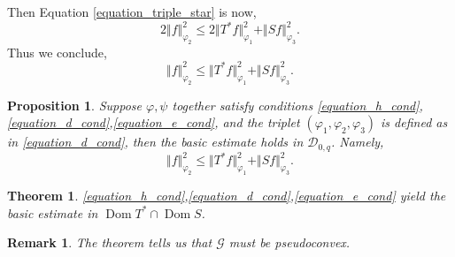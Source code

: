 \documentclass{article}
\newtheorem{theorem}{Theorem} [section]
\newtheorem{proposition}{Proposition}[section]
\newtheorem{remark}{Remark}[section]
\DeclareMathOperator{\Dom}{Dom}
\newcommand{\norm}[1]{\Vert #1 \Vert}
\newcommand{\G}[0]{\mathcal{G}}
\begin{document}
Then Equation \eqref{equation_triple_star} is now,
\begin{equation*}
  2\norm{f}_{\varphi_2}^2\leq 2\norm{T^*f}_{\varphi_1}^2+\norm{Sf}_{\varphi_3}^2.
\end{equation*}
Thus we conclude,
\begin{equation*}
  \norm{f}_{\varphi_2}^2\leq \norm{T^*f}_{\varphi_1}^2+\norm{Sf}_{\varphi_3}^2.
\end{equation*}
\begin{proposition}
  Suppose $\varphi,\psi$ together satisfy conditions \eqref{equation_h_cond},\eqref{equation_d_cond},\eqref{equation_e_cond}, and the triplet $(\varphi_1,\varphi_2,\varphi_3)$ is defined as in \eqref{equation_d_cond}, then the basic estimate holds in $\mathcal{D}_{0,q}$. Namely,
  \begin{equation*}
  \norm{f}_{\varphi_2}^2\leq \norm{T^*f}_{\varphi_1}^2+\norm{Sf}_{\varphi_3}^2.
\end{equation*}
\end{proposition}
\begin{theorem}
  \eqref{equation_h_cond},\eqref{equation_d_cond},\eqref{equation_e_cond} yield the basic estimate in $\Dom T^*\cap\Dom S$.
\end{theorem}
\begin{remark}
  The theorem tells us that $\G$ must be pseudoconvex.
\end{remark}
\end{document}
